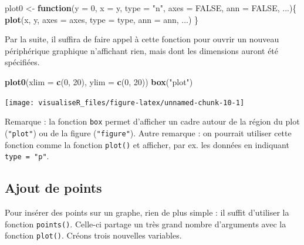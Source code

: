 \documentclass[]{article}
\newenvironment{Shaded}{\begin{snugshade}}{\end{snugshade}}
\newcommand{\ControlFlowTok}[1]{\textcolor[rgb]{0.13,0.29,0.53}{\textbf{#1}}}
\newcommand{\DataTypeTok}[1]{\textcolor[rgb]{0.13,0.29,0.53}{#1}}
\newcommand{\DecValTok}[1]{\textcolor[rgb]{0.00,0.00,0.81}{#1}}
\newcommand{\KeywordTok}[1]{\textcolor[rgb]{0.13,0.29,0.53}{\textbf{#1}}}
\newcommand{\NormalTok}[1]{#1}
\newcommand{\OtherTok}[1]{\textcolor[rgb]{0.56,0.35,0.01}{#1}}
\newcommand{\StringTok}[1]{\textcolor[rgb]{0.31,0.60,0.02}{#1}}
\begin{document}
\begin{Shaded}
\begin{Highlighting}[]
\NormalTok{plot0 <-}\StringTok{ }\ControlFlowTok{function}\NormalTok{(}\DataTypeTok{y =} \DecValTok{0}\NormalTok{, }\DataTypeTok{x =}\NormalTok{ y, }\DataTypeTok{type =} \StringTok{"n"}\NormalTok{, }\DataTypeTok{axes =} \OtherTok{FALSE}\NormalTok{, }\DataTypeTok{ann =} \OtherTok{FALSE}\NormalTok{, ...)\{}
\KeywordTok{plot}\NormalTok{(x, y, }\DataTypeTok{axes =}\NormalTok{ axes, }\DataTypeTok{type =}\NormalTok{ type, }\DataTypeTok{ann =}\NormalTok{ ann, ...)}
\NormalTok{\}}
\end{Highlighting}
\end{Shaded}

Par la suite, il suffira de faire appel à cette fonction pour ouvrir un nouveau périphérique graphique n'affichant rien, mais dont les dimensions auront été spécifiées.

\begin{Shaded}
\begin{Highlighting}[]
\KeywordTok{plot0}\NormalTok{(}\DataTypeTok{xlim =} \KeywordTok{c}\NormalTok{(}\DecValTok{0}\NormalTok{, }\DecValTok{20}\NormalTok{), }\DataTypeTok{ylim =} \KeywordTok{c}\NormalTok{(}\DecValTok{0}\NormalTok{, }\DecValTok{20}\NormalTok{))}
\KeywordTok{box}\NormalTok{(}\StringTok{"plot"}\NormalTok{)}
\end{Highlighting}
\end{Shaded}

\begin{center}\texttt{[image: visualiseR\_files/figure-latex/unnamed-chunk-10-1]} \end{center}

Remarque : la fonction \texttt{box} permet d'afficher un cadre autour de la région du plot (\texttt{"plot"}) ou de la figure (\texttt{"figure"}). Autre remarque : on pourrait utiliser cette fonction comme la fonction \texttt{plot()} et afficher, par ex. les données en indiquant \texttt{type\ =\ "p"}.

\hypertarget{ajout-de-points}{%
\subsection{Ajout de points}\label{ajout-de-points}}

Pour insérer des points sur un graphe, rien de plus simple : il suffit d'utiliser la fonction \texttt{points()}. Celle-ci partage un très grand nombre d'arguments avec la fonction \texttt{plot()}.
Créons trois nouvelles variables.
\end{document}
